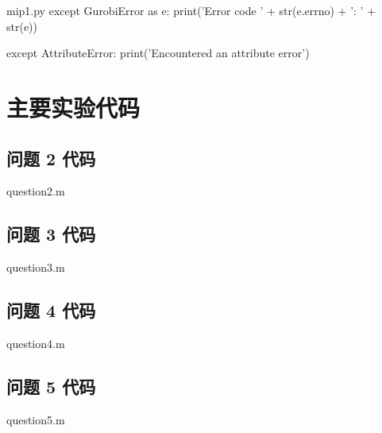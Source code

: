 \documentclass[bwprint]{gmcmthesis}
\begin{document}
\begin{appendices}
\begin{Python}{mip1.py}
except GurobiError as e:
    print('Error code ' + str(e.errno) + ': ' + str(e))

except AttributeError:
    print('Encountered an attribute error')
\end{Python}

\clearpage
\section{主要实验代码}%
\vspace{-2ex} 
\subsection{问题 2 代码}
\begin{Matlab}{question2.m}
\end{Matlab}

\subsection{问题 3 代码}
\begin{Matlab}{question3.m}
\end{Matlab}

\subsection{问题 4 代码}
\begin{Matlab}{question4.m}
\end{Matlab}

\subsection{问题 5 代码}
\begin{Matlab}{question5.m}
\end{Matlab}

\end{appendices}
\end{document}
